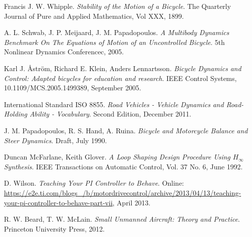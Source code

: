 \begin{thebibliography}{9}
Francis J. W. Whipple. \textit{Stability of the Motion of a Bicycle}. The Quarterly Journal of Pure and Applied Mathematics, Vol XXX, 1899.

A. L. Schwab, J. P. Meijaard, J. M. Papadopoulos. \textit{A Multibody Dynamics Benchmark On The Equations of Motion of an Uncontrolled Bicycle}. 5th Nonlinear Dynamics Conferencec, 2005. 

Karl J. \AA str{\"o}m, Richard E. Klein, Anders Lennartsson. \textit{Bicycle Dynamics and Control: Adapted bicycles for education and research}. IEEE Control Systems, 10.1109/MCS.2005.1499389, September 2005.
 
International Standard ISO 8855. \textit{Road Vehicles - Vehicle Dynamics and Road-Holding Ability - Vocabulary}. Second Edition, December 2011.

J. M. Papadopoulos, R. S. Hand, A. Ruina. \textit{Bicycle and Motorcycle Balance and Steer Dynamics}. Draft, July 1990.

Duncan McFarlane, Keith Glover. 
\textit{A Loop Shaping Design Procedure Using $H_{\infty}$ Synthesis}. IEEE Transactions on Automatic Control, Vol. 37 No. 6, June 1992.

D. Wilson. \textit{Teaching Your PI Controller to Behave}. Online: \url{https://e2e.ti.com/blogs_/b/motordrivecontrol/archive/2013/04/13/teaching-your-pi-controller-to-behave-part-vii}, April 2013.

R. W. Beard, T. W. McLain. \textit{Small Unmanned Aircraft: Theory and Practice}. Princeton University Press, 2012.

\end{thebibliography}